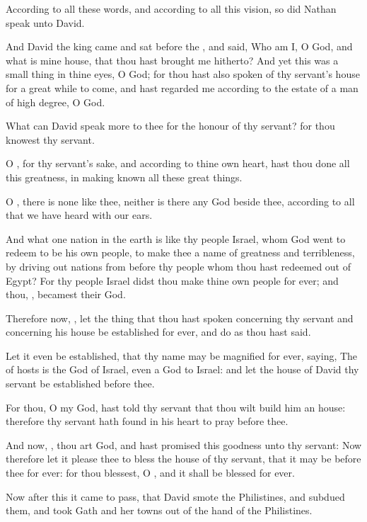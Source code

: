 \Verse According to all these words, and according to all this vision, so did Nathan speak unto David.

\Verse And David the king came and sat before the \LORD, and said, Who am I, O \LORD God, and what is mine house, that thou hast brought me hitherto?  \Verse And yet this was a small thing in thine eyes, O God; for thou hast also spoken of thy servant's house for a great while to come, and hast regarded me according to the estate of a man of high degree, O \LORD God.

\Verse What can David speak more to thee for the honour of thy servant?  for thou knowest thy servant.

\Verse O \LORD, for thy servant's sake, and according to thine own heart, hast thou done all this greatness, in making known all these great things.

\Verse O \LORD, there is none like thee, neither is there any God beside thee, according to all that we have heard with our ears.

\Verse And what one nation in the earth is like thy people Israel, whom God went to redeem to be his own people, to make thee a name of greatness and terribleness, by driving out nations from before thy people whom thou hast redeemed out of Egypt?  \Verse For thy people Israel didst thou make thine own people for ever; and thou, \LORD, becamest their God.

\Verse Therefore now, \LORD, let the thing that thou hast spoken concerning thy servant and concerning his house be established for ever, and do as thou hast said.

\Verse Let it even be established, that thy name may be magnified for ever, saying, The \LORD of hosts is the God of Israel, even a God to Israel: and let the house of David thy servant be established before thee.

\Verse For thou, O my God, hast told thy servant that thou wilt build him an house: therefore thy servant hath found in his heart to pray before thee.

\Verse And now, \LORD, thou art God, and hast promised this goodness unto thy servant: \Verse Now therefore let it please thee to bless the house of thy servant, that it may be before thee for ever: for thou blessest, O \LORD, and it shall be blessed for ever.


\Chapter
\Verse Now after this it came to pass, that David smote the Philistines, and subdued them, and took Gath and her towns out of the hand of the Philistines.


